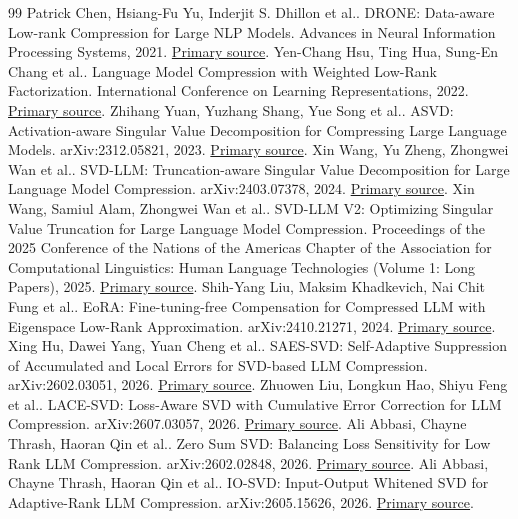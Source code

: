 \documentclass[10pt,a4paper,twocolumn]{article}
\begin{document}
\begin{thebibliography}{99}
 Patrick Chen, Hsiang-Fu Yu, Inderjit S. Dhillon et al.. DRONE: Data-aware Low-rank Compression for Large NLP Models. Advances in Neural Information Processing Systems, 2021. \href{https://proceedings.neurips.cc/paper/2021/hash/f56de5ef149cf0aedcc8f4797031e229-Abstract.html}{Primary source}.
 Yen-Chang Hsu, Ting Hua, Sung-En Chang et al.. Language Model Compression with Weighted Low-Rank Factorization. International Conference on Learning Representations, 2022. \href{https://openreview.net/pdf?id=uPv9Y3gmAI5}{Primary source}.
 Zhihang Yuan, Yuzhang Shang, Yue Song et al.. ASVD: Activation-aware Singular Value Decomposition for Compressing Large Language Models. arXiv:2312.05821, 2023. \href{https://arxiv.org/abs/2312.05821}{Primary source}.
 Xin Wang, Yu Zheng, Zhongwei Wan et al.. SVD-LLM: Truncation-aware Singular Value Decomposition for Large Language Model Compression. arXiv:2403.07378, 2024. \href{https://arxiv.org/abs/2403.07378}{Primary source}.
 Xin Wang, Samiul Alam, Zhongwei Wan et al.. SVD-LLM V2: Optimizing Singular Value Truncation for Large Language Model Compression. Proceedings of the 2025 Conference of the Nations of the Americas Chapter of the Association for Computational Linguistics: Human Language Technologies (Volume 1: Long Papers), 2025. \href{https://aclanthology.org/2025.naacl-long.217/}{Primary source}.
 Shih-Yang Liu, Maksim Khadkevich, Nai Chit Fung et al.. EoRA: Fine-tuning-free Compensation for Compressed LLM with Eigenspace Low-Rank Approximation. arXiv:2410.21271, 2024. \href{https://arxiv.org/abs/2410.21271}{Primary source}.
 Xing Hu, Dawei Yang, Yuan Cheng et al.. SAES-SVD: Self-Adaptive Suppression of Accumulated and Local Errors for SVD-based LLM Compression. arXiv:2602.03051, 2026. \href{https://arxiv.org/abs/2602.03051}{Primary source}.
 Zhuowen Liu, Longkun Hao, Shiyu Feng et al.. LACE-SVD: Loss-Aware SVD with Cumulative Error Correction for LLM Compression. arXiv:2607.03057, 2026. \href{https://arxiv.org/abs/2607.03057}{Primary source}.
 Ali Abbasi, Chayne Thrash, Haoran Qin et al.. Zero Sum SVD: Balancing Loss Sensitivity for Low Rank LLM Compression. arXiv:2602.02848, 2026. \href{https://arxiv.org/abs/2602.02848}{Primary source}.
 Ali Abbasi, Chayne Thrash, Haoran Qin et al.. IO-SVD: Input-Output Whitened SVD for Adaptive-Rank LLM Compression. arXiv:2605.15626, 2026. \href{https://arxiv.org/abs/2605.15626}{Primary source}.

\end{thebibliography}
\end{document}

